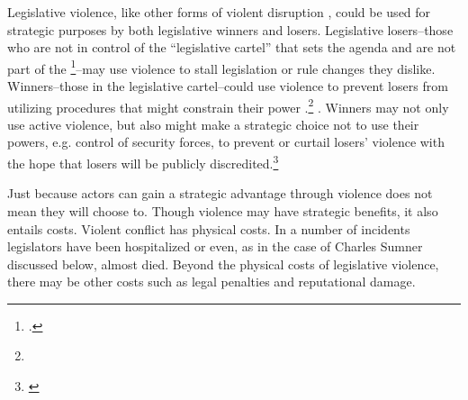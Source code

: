 \documentclass[a4paper]{article}\usepackage[]{graphicx}\usepackage[]{color}
\begin{document}
Legislative violence, like other forms of violent disruption \citep[]{Beaulieu2008,BeaulieuForthcoming,wilkinson2006}, could be used for strategic purposes by both legislative winners and losers. Legislative losers--those who are not in control of the ``legislative cartel''  that sets the agenda \citep{cox2007} and  are not part of the \footnote{ \citep[93]{tsebelis2002}.}--may use violence to stall legislation or rule changes they dislike. Winners--those in the legislative cartel--could use violence to prevent losers from utilizing procedures that might constrain their  power .\footnote{}  \citep{Spary2013}. Winners may not only use active violence, but also might make a strategic choice not to use their powers, e.g. control of security forces, to prevent or curtail losers' violence with the hope that losers will be publicly discredited.\footnote{ \citep{skocpol1979}  \citep{mcadam1982,tarrow1989} }

Just because actors can gain a strategic advantage  through violence does not mean they will choose to. Though violence may have strategic benefits, it also entails costs. Violent conflict has physical costs. In a number of incidents legislators have been hospitalized or even, as in the case of Charles Sumner discussed below, almost died. Beyond the physical costs of legislative violence, there may be other costs such as legal penalties and reputational damage.
\end{document}
